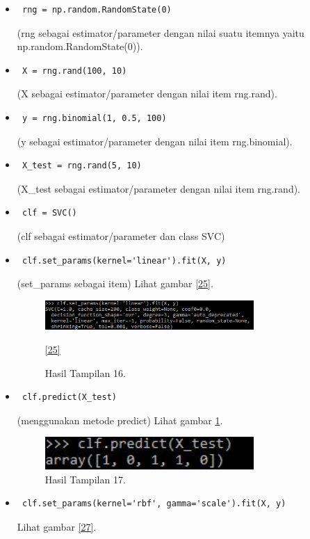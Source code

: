 \begin{enumerate}
\begin{itemize}
\item\begin{verbatim} rng = np.random.RandomState(0)\end{verbatim}(rng sebagai estimator/parameter dengan nilai suatu itemnya yaitu np.random.RandomState(0)).
\item\begin{verbatim} X = rng.rand(100, 10)\end{verbatim}(X sebagai estimator/parameter dengan nilai item rng.rand).
\item\begin{verbatim} y = rng.binomial(1, 0.5, 100)\end{verbatim}(y sebagai estimator/parameter dengan nilai item rng.binomial).
\item\begin{verbatim} X_test = rng.rand(5, 10)\end{verbatim}(X\_test sebagai estimator/parameter dengan nilai item rng.rand).
\item\begin{verbatim} clf = SVC()\end{verbatim}(clf sebagai estimator/parameter dan class SVC)
\item\begin{verbatim} clf.set_params(kernel='linear').fit(X, y)\end{verbatim}(set\_params sebagai item) Lihat gambar \ref{25}.
\begin{figure}[!htbp]\centerline{\includegraphics[width=0.75\textwidth]{figures/huda/25.JPG}}\caption{Hasil Tampilan 16.}\ref{25}\end{figure}
\item\begin{verbatim} clf.predict(X_test)\end{verbatim}(menggunakan metode predict) Lihat gambar \ref{26}.
\begin{figure}[!htbp]\centerline{\includegraphics[width=0.75\textwidth]{figures/huda/26.JPG}}\caption{Hasil Tampilan 17.}\label{26}\end{figure}
\item\begin{verbatim} clf.set_params(kernel='rbf', gamma='scale').fit(X, y)\end{verbatim} Lihat gambar \ref{27}.

\end{itemize}
\end{enumerate}
